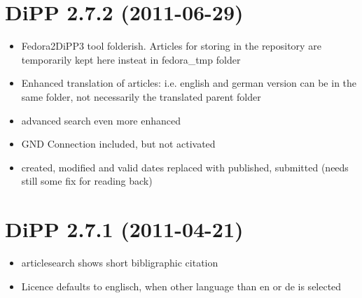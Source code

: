 \documentclass[a4paper,10pt,ngerman]{sphinxmanual}
\begin{document}
\section{DiPP 2.7.2 (2011-06-29)}
\label{changelog:dipp-2-7-2-2011-06-29}\begin{itemize}
\item {} 
Fedora2DiPP3 tool folderish. Articles for storing in the repository
are temporarily kept here insteat in fedora\_tmp folder

\item {} 
Enhanced translation of articles: i.e. english and german version can
be in the same folder, not necessarily the translated parent folder

\item {} 
advanced search even more enhanced

\item {} 
GND Connection included, but not activated

\item {} 
created, modified and valid dates replaced with published, submitted
(needs still some fix for reading back)

\end{itemize}


\section{DiPP 2.7.1 (2011-04-21)}
\label{changelog:dipp-2-7-1-2011-04-21}\begin{itemize}
\item {} 
articlesearch shows short bibligraphic citation

\item {} 
Licence defaults to englisch, when other language than en or de is
selected

\end{itemize}
\end{document}
